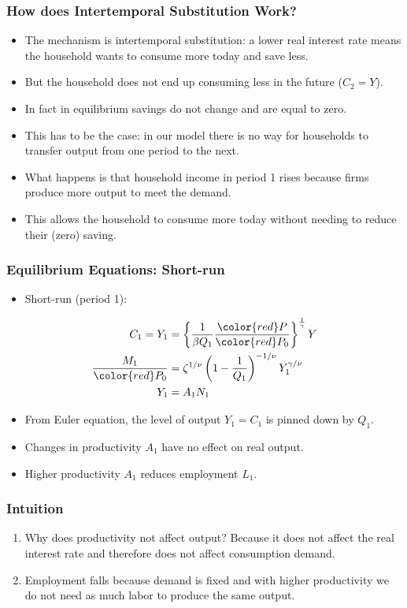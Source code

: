 \documentclass[english,xcolor=svgnames]{beamer}
\begin{document}
\begin{frame}
	\frametitle{How does Intertemporal Substitution Work?
	}
	\begin{itemize}
		\item The mechanism is intertemporal substitution: a lower real interest rate means the household wants to consume more today and save less. 
		\item But the household does not end up consuming less in the future ($C_2=Y$). 
		\item In fact in equilibrium savings do not change and are equal to zero.
		\item This has to be the case: in our model there is no way for households to transfer output from one period to the next.
		\item What happens is that household income in period 1 rises because firms produce more output to meet the demand.
		\item This allows the household to consume more today without needing to reduce their (zero) saving.
	\end{itemize}
\end{frame}
	

\begin{frame}
\frametitle{Equilibrium Equations: Short-run}
\begin{itemize}
	\item Short-run (period 1):
\end{itemize}
\begin{align*}
	C_1 = Y_1&= \left\{ \frac{1}{\beta Q_1} \frac{\color{red} P}{\color{red} P_0} \right\}^{\frac{1}{\gamma}} Y \\
	\frac{M_1}{\color{red} P_0}&=\zeta^{1/\nu}\left(1-\frac{1}{Q_1}\right)^{-1/\nu}Y_{1}^{\gamma/\nu}\\
	Y_1&=A_1N_{1}  
\end{align*}
\begin{itemize}
	\item From Euler equation, the level of output $Y_1 = C_1$ is pinned down by $Q_1$.
	\item Changes in productivity $A_1$ have no effect on real output.
	\item Higher productivity $A_1$ reduces employment $L_1$.
\end{itemize}
\end{frame}

\begin{frame}
\frametitle{Intuition
}
\begin{enumerate}[3.]
	\item Why does productivity not affect output? Because it does not affect the real interest rate and therefore does not affect consumption demand.
	\item Employment falls because demand is fixed and with higher productivity we do not need as much labor to produce the same output.
\end{enumerate}
\end{frame}
\end{document}

